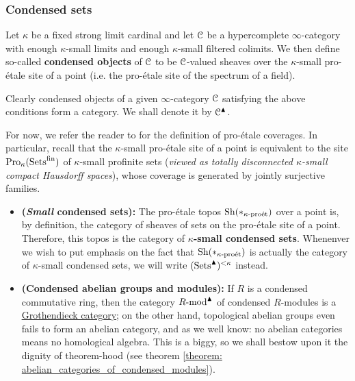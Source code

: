             \subsubsection{Condensed sets}
                \begin{definition}[Condensation] \label{def: condensation}
                    Let $\kappa$ be a fixed strong limit cardinal and let $\mathcal{C}$ be a hypercomplete $\infty$-category with enough $\kappa$-small limits and enough $\kappa$-small filtered colimits. We then define so-called \textbf{condensed objects} of $\mathcal{C}$ to be $\mathcal{C}$-valued sheaves over the $\kappa$-small pro-\'etale site of a point (i.e. the pro-\'etale site of the spectrum of a field). 
                    
                    Clearly condensed objects of a given $\infty$-category $\mathcal{C}$ satisfying the above conditions form a category. We shall denote it by $\mathcal{C}^{\blacktriangle}$.
                \end{definition}
                \begin{remark}
                    For now, we refer the reader to \cite[Definition 4.1.1 and Remark 4.1.3]{bhatt_scholze_2014_pro_etale} for the definition of pro-\'etale coverages. In particular, recall that the $\kappa$-small pro-\'etale site of a point is equivalent to the site $\mathrm{Pro}_{\kappa}(\mathrm{Sets}^{\mathrm{fin}})$ of $\kappa$-small profinite sets (\textit{viewed as totally disconnected $\kappa$-small compact Hausdorff spaces}), whose coverage is generated by jointly surjective families. 
                \end{remark}
                \begin{example}
                    \noindent
                    \begin{itemize}
                        \item \textbf{(\textit{Small} condensed sets):} The pro-\'etale topos $\mathrm{Sh}(*_{\kappa\text{-}\mathrm{pro\acute{e}t}})$ over a point is, by definition, the category of sheaves of sets on the pro-\'etale site of a point. Therefore, this topos is the category of \textbf{$\kappa$-small condensed sets}. Whenenver we wish to put emphasis on the fact that $\mathrm{Sh}(*_{\kappa\text{-}\mathrm{pro\acute{e}t}})$ is actually the category of $\kappa$-small condensed sets, we will write $(\mathrm{Sets}^{\blacktriangle})^{< \kappa}$ instead.
                        \item \textbf{(Condensed abelian groups and modules):} If $R$ is a condensed commutative ring, then the category $R\text{-}\mathrm{mod}^{\blacktriangle}$ of condensed $R$-modules is a \href{https://ncatlab.org/nlab/show/Grothendieck+category}{\underline{Grothendieck category}}; on the other hand, topological abelian groups even fails to form an abelian category, and as we well know: no abelian categories means no homological algebra. This is a biggy, so we shall bestow upon it the dignity of theorem-hood (see theorem \ref{theorem: abelian_categories_of_condensed_modules}).
                    \end{itemize}
                \end{example}
